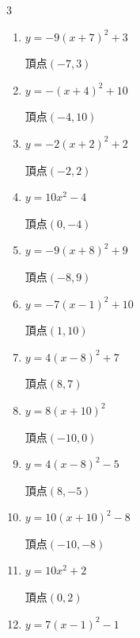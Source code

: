 \begin{multicols}{3}
\begin{enumerate}
        $\displaystyle 頂点\left( 4 , 7 \right)$

  \item $\displaystyle y=-9\left( x+7\right)^{2}+3$

        $\displaystyle 頂点\left( -7 , 3 \right)$

  \item $\displaystyle y=-\left( x+4\right)^{2}+10$

        $\displaystyle 頂点\left( -4 , 10 \right)$

  \item $\displaystyle y=-2\left( x+2\right)^{2}+2$

        $\displaystyle 頂点\left( -2 , 2 \right)$

  \item $\displaystyle y=10x^{2}-4$

        $\displaystyle 頂点\left( 0 , -4 \right)$

  \item $\displaystyle y=-9\left( x+8\right)^{2}+9$

        $\displaystyle 頂点\left( -8 , 9 \right)$

  \item $\displaystyle y=-7\left( x-1\right)^{2}+10$

        $\displaystyle 頂点\left( 1 , 10 \right)$

  \item $\displaystyle y=4\left( x-8\right)^{2}+7$

        $\displaystyle 頂点\left( 8 , 7 \right)$

  \item $\displaystyle y=8\left( x+10\right)^{2}$

        $\displaystyle 頂点\left( -10 , 0 \right)$

  \item $\displaystyle y=4\left( x-8\right)^{2}-5$

        $\displaystyle 頂点\left( 8 , -5 \right)$

  \item $\displaystyle y=10\left( x+10\right)^{2}-8$

        $\displaystyle 頂点\left( -10 , -8 \right)$

  \item $\displaystyle y=10x^{2}+2$

        $\displaystyle 頂点\left( 0 , 2 \right)$

  \item $\displaystyle y=7\left( x-1\right)^{2}-1$


\end{enumerate}
\end{multicols}
